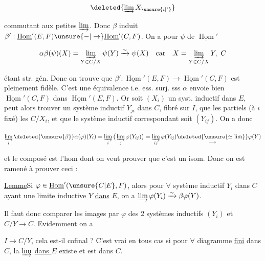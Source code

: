 
\[\deleted{\varinjlim X_{\unsure{i|'}}}\]



commutant aux petites $\varinjlim$. Donc $\beta$ induit $\beta':\underline{\operatorname{Hom}}'(E,F)\unsure{-|\to}\underline{\operatorname{Hom}}'(C,F)$. On a pour $\psi$ de $\underline{\operatorname{Hom}}'$

\[\alpha\beta(\psi)(X)=\varinjlim_{Y\in C/X}\psi(Y)\xrightarrow{\sim}\psi(X)\quad\text{car}\quad X=\varinjlim_{Y\in C/X}Y,\ C\]

étant str. gén. Donc on trouve que $\beta':\underline{\operatorname{Hom}}'(E,F)\to\underline{\operatorname{Hom}}'(C,F)$ est pleinement fidèle. C'est une équivalence i.e. ess. surj. sss $\alpha$  envoie bien $\underline{\operatorname{Hom}}'(C,F)$ dans $\underline{\operatorname{Hom}}'(E,F)$. Or soit $(X_i)$ un syst. inductif dans $E$,  peut alors trouver un système inductif $Y_{ji}$ dans $C$,  fibré sur $I$,  que les  partiels (à $i$ fixé)  les $C/X_i$,  et que le système inductif correspondant soit $(Y_{ij})$. On a donc

\[\varinjlim_i\deleted{\unsure{\beta}}\alpha(\varphi)(Y_i)=\varinjlim_i\big(\varinjlim_j\varphi(Y_{ij})\big)=\varinjlim_{ij}\varphi(Y_{ij})\underset{\longrightarrow}{\deleted{\unsure{\simeq\lim}}}\varphi(Y)\]

et le composé est l'hom dont on veut prouver que c'est un isom. Donc on est ramené à prouver ceci :

\uline{Lemme}\quad Si $\varphi\in\underline{\operatorname{Hom}}'(\unsure{C|E},F)$, alors pour $\forall$ système inductif $Y_i$ dans $C$ ayant une limite inductive $Y$ \uline{dans} $E$, on a $\varinjlim\varphi(Y_i)\xrightarrow{\sim}\beta\varphi(Y)$.

Il faut donc comparer  les images par $\varphi$ des 2 systèmes inductifs $(Y_i)$ et $C/Y\to C$. Evidemment on a


$I\to C/Y$, cela est-il cofinal ? C'est vrai en tous cas si pour $\forall$ diagramme \uline{fini} dans $C$, la $\varinjlim$ \uline{dans $E$} existe et est dans $C$.

